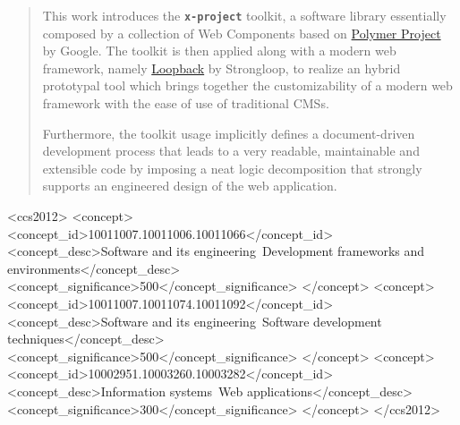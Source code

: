 \documentclass{sig-alternate}
\newcommand{\brand}[1]{\textbf{\tt #1}}
\begin{document}
\begin{abstract}
This work introduces the \brand{x-project} toolkit, a software library essentially composed by a collection of Web Components based on \href{https://www.polymer-project.org}{Polymer Project} by Google. The toolkit is then applied along with a modern web framework, namely \href{http://loopback.io/}{Loopback} by Strongloop, to realize an hybrid prototypal tool which brings together the customizability of a modern web framework with the ease of use of traditional CMSs.

Furthermore, the toolkit usage implicitly defines a document-driven development process that leads to a very readable, maintainable and extensible code by imposing a neat logic decomposition that strongly supports an engineered design of the web application.
\end{abstract}


%
%

\begin{CCSXML}
<ccs2012>
<concept>
<concept_id>10011007.10011006.10011066</concept_id>
<concept_desc>Software and its engineering~Development frameworks and environments</concept_desc>
<concept_significance>500</concept_significance>
</concept>
<concept>
<concept_id>10011007.10011074.10011092</concept_id>
<concept_desc>Software and its engineering~Software development techniques</concept_desc>
<concept_significance>500</concept_significance>
</concept>
<concept>
<concept_id>10002951.10003260.10003282</concept_id>
<concept_desc>Information systems~Web applications</concept_desc>
<concept_significance>300</concept_significance>
</concept>
</ccs2012>
\end{CCSXML}


%
%

%
%
\printccsdesc












%




\end{document}
